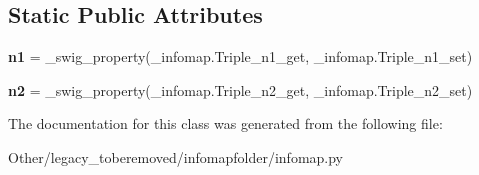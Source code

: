 \subsection*{Static Public Attributes}
\begin{DoxyCompactItemize}
\item 
\mbox{\label{classinfomapfolder_1_1infomap_1_1Triple_a30d3673d83e8be781c8e63b2eb6e0d00}} 
{\bfseries n1} = \+\_\+swig\+\_\+property(\+\_\+infomap.\+Triple\+\_\+n1\+\_\+get, \+\_\+infomap.\+Triple\+\_\+n1\+\_\+set)
\item 
\mbox{\label{classinfomapfolder_1_1infomap_1_1Triple_ad4898a4bb317ebe47e2a1e9808b955cf}} 
{\bfseries n2} = \+\_\+swig\+\_\+property(\+\_\+infomap.\+Triple\+\_\+n2\+\_\+get, \+\_\+infomap.\+Triple\+\_\+n2\+\_\+set)
\end{DoxyCompactItemize}


The documentation for this class was generated from the following file\+:\begin{DoxyCompactItemize}
\item 
Other/legacy\+\_\+toberemoved/infomapfolder/infomap.\+py\end{DoxyCompactItemize}
